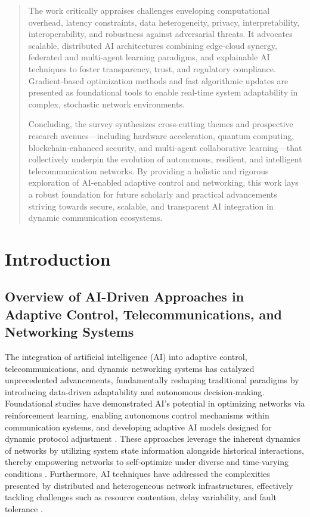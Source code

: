 \begin{abstract}
The work critically appraises challenges enveloping computational overhead, latency constraints, data heterogeneity, privacy, interpretability, interoperability, and robustness against adversarial threats. It advocates scalable, distributed AI architectures combining edge-cloud synergy, federated and multi-agent learning paradigms, and explainable AI techniques to foster transparency, trust, and regulatory compliance. Gradient-based optimization methods and fast algorithmic updates are presented as foundational tools to enable real-time system adaptability in complex, stochastic network environments.

Concluding, the survey synthesizes cross-cutting themes and prospective research avenues—including hardware acceleration, quantum computing, blockchain-enhanced security, and multi-agent collaborative learning—that collectively underpin the evolution of autonomous, resilient, and intelligent telecommunication networks. By providing a holistic and rigorous exploration of AI-enabled adaptive control and networking, this work lays a robust foundation for future scholarly and practical advancements striving towards secure, scalable, and transparent AI integration in dynamic communication ecosystems.
\end{abstract}

\section{Introduction}

\subsection{Overview of AI-Driven Approaches in Adaptive Control, Telecommunications, and Networking Systems}

The integration of artificial intelligence (AI) into adaptive control, telecommunications, and dynamic networking systems has catalyzed unprecedented advancements, fundamentally reshaping traditional paradigms by introducing data-driven adaptability and autonomous decision-making. Foundational studies have demonstrated AI's potential in optimizing networks via reinforcement learning, enabling autonomous control mechanisms within communication systems, and developing adaptive AI models designed for dynamic protocol adjustment \cite{ref17,ref18,ref19,ref20}. These approaches leverage the inherent dynamics of networks by utilizing system state information alongside historical interactions, thereby empowering networks to self-optimize under diverse and time-varying conditions \cite{ref1,ref2,ref3}. Furthermore, AI techniques have addressed the complexities presented by distributed and heterogeneous network infrastructures, effectively tackling challenges such as resource contention, delay variability, and fault tolerance \cite{ref4,ref5,ref6}. 

